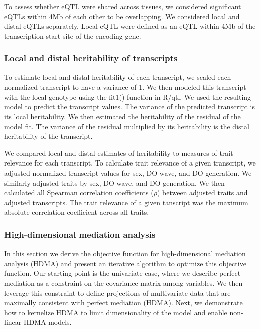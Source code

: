 \documentclass[
]{article}
\begin{document}
To assess whether eQTL were shared across tissues, we considered
significant eQTLs within 4Mb of each other to be overlapping. We
considered local and distal eQTLs separately. Local eQTL were defined as
an eQTL within 4Mb of the transcription start site of the encoding gene.

\subsubsection{Local and distal heritability of
transcripts}\label{local-and-distal-heritability-of-transcripts}

To estimate local and distal heritability of each transcript, we scaled
each normalized transcript to have a variance of 1. We then modeled this
transcript with the local genotype using the fit1() function in R/qtl.
We used the resulting model to predict the transcript values. The
variance of the predicted transcript is its local heritability. We then
estimated the heritability of the residual of the model fit. The
variance of the residual multiplied by its heritability is the distal
heritability of the transcript.

We compared local and distal estimates of heritability to measures of
trait relevance for each transcript. To calculate trait relevance of a
given transcript, we adjusted normalized transcript values for sex, DO
wave, and DO generation. We similarly adjusted traits by sex, DO wave,
and DO generation. We then calculated all Spearman correlation
coefficients (\(\rho\)) between adjusted traits and adjusted
transcripts. The trait relevance of a given tanscript was the maximum
absolute correlation coefficient across all traits.

\subsubsection{High-dimensional mediation
analysis}\label{high-dimensional-mediation-analysis}

In this section we derive the objective function for high-dimensional
mediation analysis (HDMA) and present an iterative algorithm to optimize
this objective function. Our starting point is the univariate case,
where we describe perfect mediation as a constraint on the covariance
matrix among variables. We then leverage this constraint to define
projections of multivariate data that are maximally consistent with
perfect mediation (HDMA). Next, we demonstrate how to kernelize HDMA to
limit dimensionality of the model and enable non-linear HDMA models.
\end{document}
